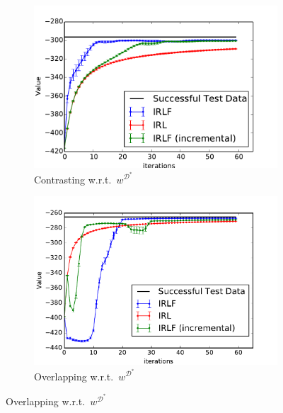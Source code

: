 \documentclass{aamas2016}
\begin{document}
\begin{figure}[t]
   \hspace{-7mm}
  \begin{subfigure}[t]{0.55\columnwidth}
    \includegraphics[clip=true,width=1.5\textwidth]{images/expert_apprentice_contrastive.pdf}
    \caption{Contrasting w.r.t.\ $w^{\mathcal{D}^*}$}
    \label{fig:toy_expert_apprentice_contrastive}
   \end{subfigure}
   \hspace{15mm}
   \begin{subfigure}[t]{0.55\columnwidth}
    \includegraphics[trim=0.6cm 0.0cm 0.0cm 0.0cm,clip=true,width=1.45\textwidth]{images/over_expert_apprentice.pdf}
    \caption{Overlapping w.r.t.\ $w^{\mathcal{D}^*}$}
    \label{fig:toy_expert_apprentice_overlapping}
    \end{subfigure}
    \hspace{13mm}

\end{figure}
\end{document}
